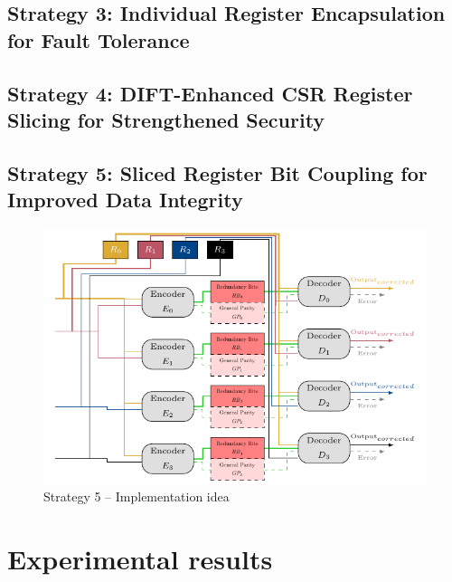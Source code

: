 \subsection{Strategy 3: Individual Register Encapsulation for Fault Tolerance}

\subsection{Strategy 4: DIFT-Enhanced CSR Register Slicing for Strengthened Security}

\subsection{Strategy 5: Sliced Register Bit Coupling for Improved Data Integrity}

\begin{figure}[ht]
    \centering
    \includegraphics[page=1]{c6_group_composition/img/implem5_spaghetti.pdf}
    \caption{Strategy 5 -- Implementation idea}
    \label{fig:strategy_5_functionning}
\end{figure}

\section{Experimental results}
\label{section:chap6_evaluation}

